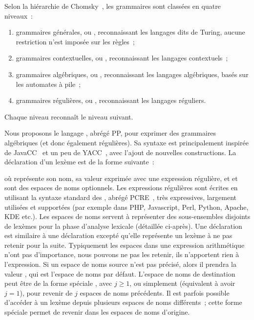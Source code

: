 Selon la hiérarchie de Chomsky~, les grammaires sont classées
en quatre niveaux~:
%
\begin{enumerate}

\item grammaires {\strong générales}, ou ,
reconnaissant les langages dits de Turing, aucune restriction n'est imposée sur
les règles~;

\item grammaires {\strong contextuelles}, ou , reconnaissant les langages contextuels~;

\item grammaires {\strong algébriques}, ou ,
reconnaissant les langages algébriques, basés sur les automates à pile~;

\item grammaires {\strong régulières}, ou ,
reconnaissant les langages réguliers.

\end{enumerate}
%
Chaque niveau reconnaît le niveau suivant.

Nous proposons le langage , abrégé PP, pour exprimer des
grammaires algébriques (et donc également régulières). Sa syntaxe est
principalement inspirée de JavaCC~ et un peu de
YACC~, avec l'ajout de nouvelles constructions. La déclaration
d'un lexème est de la forme suivante~:
%
\begin{pre}
\end{pre}
%
où  représente son nom,  sa valeur exprimée avec une
expression régulière, et  et  sont des espaces
de noms optionnels. Les expressions régulières sont écrites en utilisant la
syntaxe standard des , abrégé
PCRE~, très expressives, largement utilisées et supportées (par
exemple dans PHP, Javascript, Perl, Python, Apache, KDE etc.). Les espaces de
noms servent à représenter des sous-ensembles disjoints de lexèmes pour la phase
d'analyse lexicale (détaillée ci-après). Une déclaration  est
similaire à une déclaration  excepté qu'elle représente un lexème
à ne pas retenir pour la suite. Typiquement les espaces dans une expression
arithmétique n'ont pas d'importance, nous pouvons ne pas les retenir, ils
n'apportent rien à l'expression. Si un espace de noms source n'est pas précisé,
alors il prendra la valeur , qui est l'espace de noms par défaut.
L'espace de noms de destination peut être de la forme spéciale
, avec $j \geq 1$, ou simplement 
(équivalent à avoir $j = 1$), pour revenir de $j$ espaces de noms précédents. Il
est parfois possible d'accéder à un lexème depuis plusieurs espaces de noms
différents~; cette forme spéciale permet de revenir dans les espaces de noms
d'origine. \\

